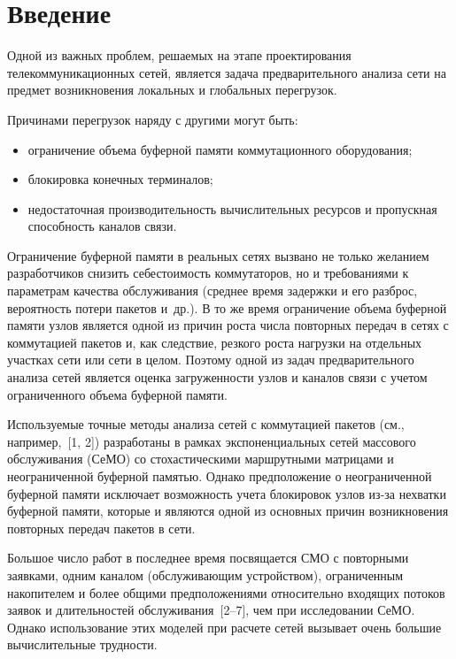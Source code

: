       \begin{multicols}{2}

      \label{st\stat}
           
\section{Введение}

     Одной из важных проблем, решаемых на этапе проектирования 
телекоммуникационных сетей, является задача предварительного анализа сети 
на предмет возникновения локальных и глобальных перегрузок.
     
     Причинами перегрузок наряду с другими могут быть:
     \begin{itemize}
     \item ограничение объема буферной памяти коммутационного 
оборудования;
     \item блокировка конечных терминалов;
     \item недостаточная производительность вычислительных ресурсов и 
пропускная способность каналов связи.
     \end{itemize}
     
     Ограничение буферной памяти в реальных сетях вызвано не только 
желанием разработчиков снизить себестоимость коммутаторов, но и 
требованиями к параметрам качества обслуживания (среднее время задержки и 
его разброс, вероятность потери пакетов и~др.). В то же время ограничение 
объема буферной памяти узлов является одной из причин роста числа 
повторных передач в сетях с коммутацией пакетов и, как следствие, резкого 
рос\-та нагрузки на отдельных участках сети или сети в целом. Поэтому одной из 
задач предварительного анализа сетей является оценка загруженности узлов и 
каналов связи с учетом ограниченного объема буферной памяти.
     
     Используемые точные методы анализа сетей с коммутацией пакетов (см., 
например,~[1, 2]) разработаны в рамках экспоненциальных  сетей 
массового обслуживания (СеМО) со стохастическими маршрутными матрицами и 
неограниченной буферной памятью. Однако предположение о неограниченной 
буферной памяти исключает возможность учета блокировок узлов из-за 
нехватки буферной памяти, которые и являются одной из основных причин 
возникновения повторных передач пакетов в сети.
     
     Большое число работ в последнее время посвящается СМО
     с повторными заявками, одним каналом (обслуживающим 
устройством), ограниченным накопителем и более общими предположениями 
относительно входящих потоков заявок и длительностей обслуживания~[2--7], 
чем при исследовании СеМО. Однако использование этих моделей при расчете 
сетей вызывает очень большие вычислительные трудности.
     

\end{multicols}
